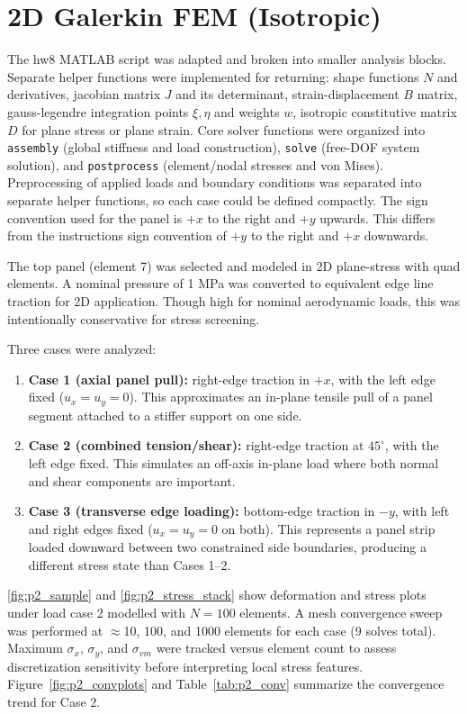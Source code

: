 \documentclass{article}
\begin{document}
\section*{2D Galerkin FEM (Isotropic)}
The hw8 MATLAB script was adapted and broken into smaller analysis blocks. Separate helper functions were implemented for returning: shape functions $N$ and derivatives, jacobian matrix $J$ and its determinant, strain-displacement $B$ matrix, gauss-legendre integration points $\xi, \eta$ and weights $w$, isotropic constitutive matrix $D$ for plane stress or plane strain. Core solver functions were organized into \texttt{assembly} (global stiffness and load construction), \texttt{solve} (free-DOF system solution), and \texttt{postprocess} (element/nodal stresses and von Mises). Preprocessing of applied loads and boundary conditions was separated into separate helper functions, so each case could be defined compactly. The sign convention used for the panel is $+x$ to the right and $+y$ upwards. This differs from the instructions sign convention of $+y$ to the right and $+x$ downwards. 

The top panel (element 7) was selected and modeled in 2D plane-stress with quad elements. A nominal pressure of 1 MPa was converted to equivalent edge line traction for 2D application. Though high for nominal aerodynamic loads, this was intentionally conservative for stress screening.

Three cases were analyzed:
\begin{enumerate}
    \item \textbf{Case 1 (axial panel pull):} right-edge traction in $+x$, with the left edge fixed ($u_x=u_y=0$). This approximates an in-plane tensile pull of a panel segment attached to a stiffer support on one side.
    \item \textbf{Case 2 (combined tension/shear):} right-edge traction at $45^\circ$, with the left edge fixed. This simulates an off-axis in-plane load where both normal and shear components are important.
    \item \textbf{Case 3 (transverse edge loading):} bottom-edge traction in $-y$, with left and right edges fixed ($u_x=u_y=0$ on both). This represents a panel strip loaded downward between two constrained side boundaries, producing a different stress state than Cases 1--2.
\end{enumerate}

\autoref{fig:p2_sample} and \autoref{fig:p2_stress_stack} show deformation and stress plots under load case 2 modelled with $N = 100$ elements. A mesh convergence sweep was performed at $\approx$10, 100, and 1000 elements for each case (9 solves total). Maximum $\sigma_x$, $\sigma_y$, and $\sigma_{vm}$ were tracked versus element count to assess discretization sensitivity before interpreting local stress features. Figure~\ref{fig:p2_convplots} and Table~\ref{tab:p2_conv} summarize the convergence trend for Case 2.
\end{document}
